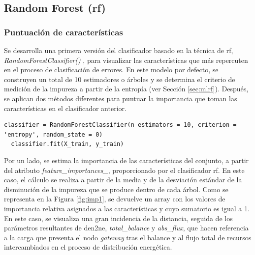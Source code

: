 \subsection{Random Forest (\acrshort{rf})}
\label{sec:rf}

\subsubsection{Puntuación de características}
\label{sec:rf1}

Se desarrolla una primera versión del clasificador basado en la técnica de \gls{rf}, \textit{RandomForestClassifier()} \cite{rfsklearn}, para visualizar las características que más repercuten en el proceso de clasificación de errores. En este modelo por defecto, se construyen un total de 10 estimadores o árboles y se determina el criterio de medición de la impureza a partir de la entropía (ver Sección \ref{sec:mlrf}). Después, se aplican dos métodos diferentes para puntuar la importancia que toman las características en el clasificador anterior. 

\vspace{3mm}

\begin{lstlisting}[style=Python, caption={Clasificador RF por defecto}]
  classifier = RandomForestClassifier(n_estimators = 10, criterion = 'entropy', random_state = 0) 
  classifier.fit(X_train, y_train)
\end{lstlisting}
  
\vspace{3mm}

Por un lado, se estima la importancia de las características del conjunto, a partir del atributo \textit{feature\_importances\_}, proporcionado por el clasificador \gls{rf}. En este caso, el cálculo se realiza a partir de la media y de la desviación estándar de la disminución de la impureza que se produce dentro de cada árbol. Como se representa en la Figura \ref{fig:imp1}, se devuelve un array con los valores de importancia relativa asignados a las características y cuyo sumatorio es igual a 1. En este caso, se visualiza una gran incidencia de la distancia, seguida de los parámetros resultantes de \gls{den2ne}, \textit{total\_balance} y \textit{abs\_flux}, que hacen referencia a la carga que presenta el nodo \textit{gateway} tras el balance y al flujo total de recursos intercambiados en el proceso de distribución energética.

\vspace{3mm}

